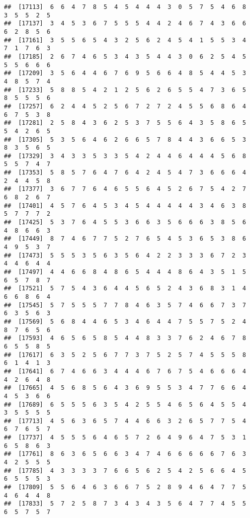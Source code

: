 \documentclass[
]{book}
\begin{document}
\begin{verbatim}
##  [17113]  6  6  4  7  8  5  4  5  4  4  4  3  0  5  7  5  4  6  8  3  5  5  2  5
##  [17137]  3  4  5  3  6  7  5  5  5  4  4  2  4  6  7  4  3  6  6  6  2  8  5  6
##  [17161]  3  5  5  6  5  4  3  2  5  6  2  4  5  4  1  5  5  3  4  7  1  7  6  3
##  [17185]  2  6  7  4  6  5  3  4  3  5  4  4  3  0  6  2  5  4  5  5  5  6  6  6
##  [17209]  3  5  6  4  4  6  7  6  9  5  6  6  4  8  5  4  4  5  3  4  8  5  7  4
##  [17233]  5  8  8  5  4  2  1  2  5  6  2  6  5  5  4  7  3  6  5  8  5  5  5  6
##  [17257]  6  2  4  4  5  2  5  6  7  2  7  2  4  5  5  6  8  6  4  6  7  5  3  8
##  [17281]  2  5  8  4  3  6  2  5  3  7  5  5  6  4  3  5  8  6  5  5  4  2  6  5
##  [17305]  5  3  5  6  4  6  2  6  6  5  7  8  4  4  3  6  6  5  3  8  3  5  6  5
##  [17329]  3  4  3  3  5  3  3  5  4  2  4  4  6  4  4  4  5  6  8  5  5  7  4  7
##  [17353]  5  8  5  7  6  4  7  6  4  2  4  5  4  7  3  6  6  6  4  2  4  4  5  8
##  [17377]  3  6  7  7  6  4  6  5  5  6  4  5  2  6  7  5  4  2  7  6  8  2  6  7
##  [17401]  4  5  7  6  4  5  3  4  5  4  4  4  4  4  3  4  6  3  8  5  7  7  7  2
##  [17425]  5  3  7  6  4  5  5  3  6  6  3  5  6  6  6  3  8  5  6  4  8  6  6  3
##  [17449]  8  7  4  6  7  7  5  2  7  6  5  4  5  3  6  5  3  8  6  4  9  5  3  7
##  [17473]  5  5  5  3  5  6  3  5  6  4  2  2  3  3  3  6  7  2  3  4  4  6  4  4
##  [17497]  4  4  6  6  8  4  8  6  5  4  4  4  8  6  4  3  5  1  5  6  5  7  8  7
##  [17521]  5  7  5  4  3  6  4  4  5  6  5  2  4  3  6  8  3  1  4  6  6  8  6  4
##  [17545]  5  7  5  5  5  7  7  8  4  6  3  5  7  4  6  6  7  3  7  6  3  5  6  3
##  [17569]  5  6  8  4  4  6  5  3  4  6  4  4  7  5  5  7  5  2  4  8  7  6  5  6
##  [17593]  4  6  5  6  5  8  5  4  4  8  3  3  7  6  2  4  6  7  8  6  5  5  8  5
##  [17617]  6  3  5  2  5  6  7  7  3  7  5  2  5  7  4  5  5  5  8  6  1  4  1  3
##  [17641]  6  7  4  6  6  3  4  4  4  6  7  6  7  5  4  6  6  6  4  4  2  6  4  8
##  [17665]  4  5  6  8  5  6  4  3  6  9  5  5  3  4  7  7  6  6  4  4  5  3  6  6
##  [17689]  6  5  5  5  6  3  5  4  2  5  5  4  6  5  6  4  5  5  4  3  5  5  5  5
##  [17713]  4  5  6  3  6  5  7  4  4  6  6  3  2  6  5  7  7  5  4  6  7  6  5  7
##  [17737]  4  5  5  5  6  4  6  5  7  2  6  4  9  6  4  7  5  3  1  6  5  8  6  3
##  [17761]  8  6  3  6  5  6  6  3  4  7  4  6  6  6  6  6  7  6  3  4  2  5  5  5
##  [17785]  4  3  3  3  3  7  6  6  5  6  2  5  4  2  5  6  6  4  5  6  5  5  5  3
##  [17809]  5  5  6  4  6  3  6  6  7  5  2  8  9  4  6  4  7  7  5  4  6  4  4  8
##  [17833]  5  7  2  5  8  7  3  4  3  4  3  5  6  4  7  7  4  5  5  6  5  7  5  7

\end{verbatim}
\end{document}
